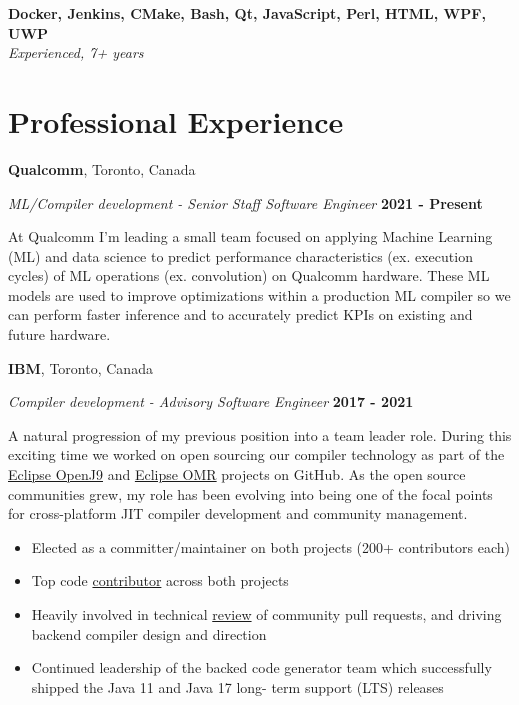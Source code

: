 \documentclass[margin,line]{res}
\begin{document}
\begin{resume}
{\bf Docker, Jenkins, CMake, Bash, Qt, JavaScript, Perl, HTML, WPF, UWP } \\
{\em Experienced, 7+ years}

\section{\sc Professional Experience}

{\bf Qualcomm}, Toronto, Canada

{\em ML/Compiler development - Senior Staff Software Engineer} \hfill {\bf 2021 - Present}
\vspace{-.12in}

At Qualcomm I'm leading a small team focused on applying Machine Learning (ML) and data science to predict performance
characteristics (ex. execution cycles) of ML operations (ex. convolution) on Qualcomm hardware. These ML models are
used to improve optimizations within a production ML compiler so we can perform faster inference and to accurately
predict KPIs on existing and future hardware.

{\bf IBM}, Toronto, Canada

{\em Compiler development - Advisory Software Engineer} \hfill {\bf 2017 - 2021}
\vspace{-.12in}

A natural progression of my previous position into a team leader role. During this exciting time we worked on open
sourcing our compiler technology as part of the \href{https://github.com/eclipse/openj9}{Eclipse OpenJ9} and 
\href{https://github.com/eclipse/omr}{Eclipse OMR} projects on GitHub. As the open source communities grew, my role has
been evolving into being one of the focal points for cross-platform JIT compiler development and community management.

\vspace{.10in}

\begin{itemize}
\item Elected as a committer/maintainer on both projects (200+ contributors each)
\item Top code 
\href{https://github.com/eclipse/omr/graphs/contributors?from=2016-03-06&to=2021-09-24&type=c}{contributor}
across both projects
\item Heavily involved in technical
\href{https://github.com/eclipse/omr/pulls?q=is%3Apr+sort%3Aupdated-desc+reviewed-by%3Afjeremic+is%3Aclosed+}{review}
of community pull requests, and driving backend compiler design and direction
\item Continued leadership of the backed code generator team which successfully shipped the Java 11 and Java 17 long-
term support (LTS) releases
\end{itemize}


\end{resume}
\end{document}
